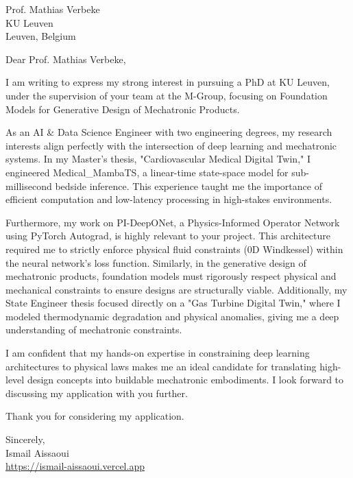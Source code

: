\documentclass[11pt, a4paper]{letter}
\begin{document}
\begin{letter}{Prof. Mathias Verbeke \\ KU Leuven \\ Leuven, Belgium}

\opening{Dear Prof. Mathias Verbeke,}

I am writing to express my strong interest in pursuing a PhD at KU Leuven, under the supervision of your team at the M-Group, focusing on Foundation Models for Generative Design of Mechatronic Products.

As an AI \& Data Science Engineer with two engineering degrees, my research interests align perfectly with the intersection of deep learning and mechatronic systems. In my Master's thesis, "Cardiovascular Medical Digital Twin," I engineered Medical\_MambaTS, a linear-time state-space model for sub-millisecond bedside inference. This experience taught me the importance of efficient computation and low-latency processing in high-stakes environments.

Furthermore, my work on PI-DeepONet, a Physics-Informed Operator Network using PyTorch Autograd, is highly relevant to your project. This architecture required me to strictly enforce physical fluid constraints (0D Windkessel) within the neural network's loss function. Similarly, in the generative design of mechatronic products, foundation models must rigorously respect physical and mechanical constraints to ensure designs are structurally viable. Additionally, my State Engineer thesis focused directly on a "Gas Turbine Digital Twin," where I modeled thermodynamic degradation and physical anomalies, giving me a deep understanding of mechatronic constraints.

I am confident that my hands-on expertise in constraining deep learning architectures to physical laws makes me an ideal candidate for translating high-level design concepts into buildable mechatronic embodiments. I look forward to discussing my application with you further.

Thank you for considering my application.

\closing{Sincerely, \\ Ismail Aissaoui \\ \href{https://ismail-aissaoui.vercel.app}{https://ismail-aissaoui.vercel.app}}

\end{letter}
\end{document}
